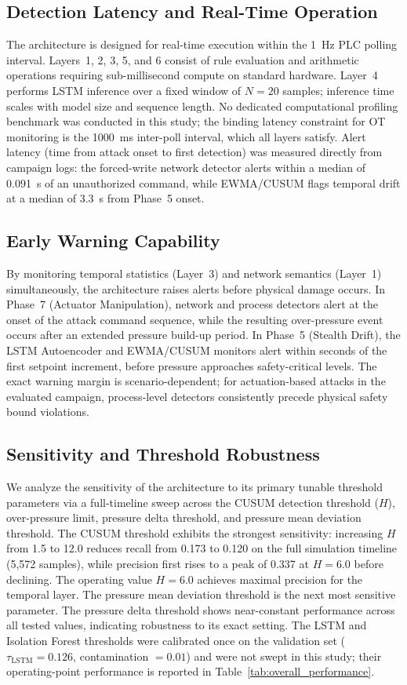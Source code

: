 \documentclass[journal,twoside,web]{ieeecolor}
\begin{document}
\subsection{Detection Latency and Real-Time Operation}
The architecture is designed for real-time execution within the 1~Hz PLC polling interval. Layers~1, 2, 3, 5, and 6 consist of rule evaluation and arithmetic operations requiring sub-millisecond compute on standard hardware. Layer~4 performs LSTM inference over a fixed window of $N=20$ samples; inference time scales with model size and sequence length. No dedicated computational profiling benchmark was conducted in this study; the binding latency constraint for OT monitoring is the 1000~ms inter-poll interval, which all layers satisfy. Alert latency (time from attack onset to first detection) was measured directly from campaign logs: the forced-write network detector alerts within a median of 0.091~s of an unauthorized command, while EWMA/CUSUM flags temporal drift at a median of 3.3~s from Phase~5 onset.

\subsection{Early Warning Capability}
By monitoring temporal statistics (Layer~3) and network semantics (Layer~1) simultaneously, the architecture raises alerts before physical damage occurs. In Phase~7 (Actuator Manipulation), network and process detectors alert at the onset of the attack command sequence, while the resulting over-pressure event occurs after an extended pressure build-up period. In Phase~5 (Stealth Drift), the LSTM Autoencoder and EWMA/CUSUM monitors alert within seconds of the first setpoint increment, before pressure approaches safety-critical levels. The exact warning margin is scenario-dependent; for actuation-based attacks in the evaluated campaign, process-level detectors consistently precede physical safety bound violations.

\subsection{Sensitivity and Threshold Robustness}
We analyze the sensitivity of the architecture to its primary tunable threshold parameters via a full-timeline sweep across the CUSUM detection threshold ($H$), over-pressure limit, pressure delta threshold, and pressure mean deviation threshold. The CUSUM threshold exhibits the strongest sensitivity: increasing $H$ from 1.5 to 12.0 reduces recall from 0.173 to 0.120 on the full simulation timeline (5{,}572 samples), while precision first rises to a peak of 0.337 at $H = 6.0$ before declining. The operating value $H = 6.0$ achieves maximal precision for the temporal layer. The pressure mean deviation threshold is the next most sensitive parameter. The pressure delta threshold shows near-constant performance across all tested values, indicating robustness to its exact setting. The LSTM and Isolation Forest thresholds were calibrated once on the validation set ($\tau_{\text{LSTM}} = 0.126$, contamination $= 0.01$) and were not swept in this study; their operating-point performance is reported in Table~\ref{tab:overall_performance}.
\end{document}
